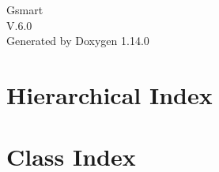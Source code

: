 \documentclass[twoside]{book}
\newcommand{\+}{\discretionary{\mbox{\scriptsize$\hookleftarrow$}}{}{}}
\newcommand{\clearemptydoublepage}{%
    \newpage{\pagestyle{empty}\cleardoublepage}%
  }
\begin{document}
  \raggedbottom
    \hypersetup{pageanchor=false,
                bookmarksnumbered=true,
                pdfencoding=unicode
               }
  \begin{titlepage}
  \vspace*{7cm}
  \begin{center}%
  {\Large Gsmart}\\
  [1ex]\large V.\+6.\+0 \\
  \vspace*{1cm}
  {\large Generated by Doxygen 1.14.0}\\
  \end{center}
  \end{titlepage}
  \clearemptydoublepage
  \tableofcontents
  \clearemptydoublepage
  \hypersetup{pageanchor=true}
\chapter{Hierarchical Index}

\chapter{Class Index}

\end{document}
